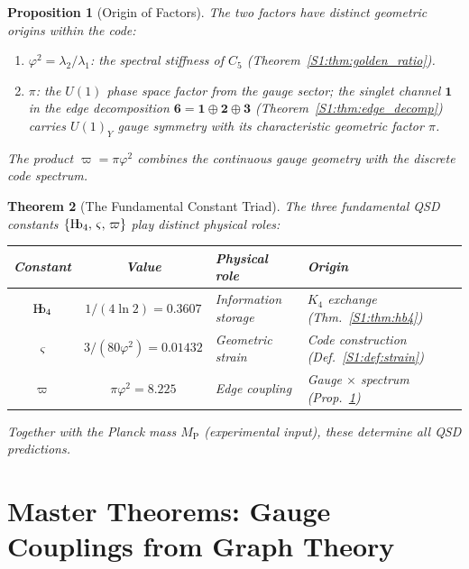 \documentclass[11pt,a4paper]{article}
\newtheorem{theorem}{Theorem}[section]
\newtheorem{proposition}[theorem]{Proposition}
\theoremstyle{definition}
\newcommand{\Hb}{\textnormal{H\kern-0.3em b}}
\newcommand{\Hbfour}{\Hb_4}
\newcommand{\gs}{\varsigma}
\newcommand{\specbond}{\varpi}
\newcommand{\Mpl}{M_{\mathrm{P}}}
\begin{document}
\begin{proposition}[Origin of Factors]
\label{S1:prop:specbond_origin}
The two factors have distinct geometric origins within the code:
\begin{enumerate}[nosep]
    \item $\varphi^2 = \lambda_2/\lambda_1$: the spectral stiffness of $C_5$ (Theorem~\ref{S1:thm:golden_ratio}).
    \item $\pi$: the $U(1)$ phase space factor from the gauge sector; the singlet channel $\mathbf{1}$ in the edge decomposition $\mathbf{6} = \mathbf{1} \oplus \mathbf{2} \oplus \mathbf{3}$ (Theorem~\ref{S1:thm:edge_decomp}) carries $U(1)_Y$ gauge symmetry with its characteristic geometric factor $\pi$.
\end{enumerate}
The product $\specbond = \pi\varphi^2$ combines the continuous gauge geometry with the discrete code spectrum.
\end{proposition}

\begin{theorem}[The Fundamental Constant Triad]
\label{S1:thm:triad}
The three fundamental QSD constants $\{\Hbfour,\, \gs,\, \specbond\}$ play distinct physical roles:
\begin{center}
\begin{tabular}{ccll}
\toprule
\textbf{Constant} & \textbf{Value} & \textbf{Physical role} & \textbf{Origin} \\
\midrule
$\Hbfour$ & $1/(4\ln 2) = 0.3607$ & Information \emph{storage} & $K_4$ exchange (Thm.~\ref{S1:thm:hb4}) \\
$\gs$ & $3/(80\varphi^2) = 0.01432$ & Geometric \emph{strain} & Code construction (Def.~\ref{S1:def:strain}) \\
$\specbond$ & $\pi\varphi^2 = 8.225$ & Edge \emph{coupling} & Gauge $\times$ spectrum (Prop.~\ref{S1:prop:specbond_origin}) \\
\bottomrule
\end{tabular}
\end{center}
Together with the Planck mass $\Mpl$ (experimental input), these determine all QSD predictions.
\end{theorem}

\section{Master Theorems: Gauge Couplings from Graph Theory}
\label{sec:master}
\end{document}
